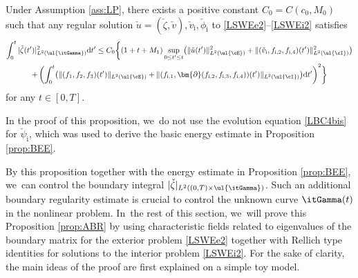 \begin{proposition}\label{prop:ABR}
Under Assumption \ref{ass:LP}, there exists a positive constant $C_0=C(c_0,M_0)$ such that any regular solution
$\check{u}=(\check{\zeta},\check{v}), \check{v}_\mathrm{i}, \check{\phi}_\mathrm{i}$ to \eqref{LSWEe2}--\eqref{LSWEi2} satisfies
\begin{multline*}
\int_0^t|\check{\zeta}(t') |_{L^2(\ul{\itGamma})}^2\mathrm{d}t'
\leq C_0 \biggl\{ (1+t+M_1)\sup_{0\leq t'\leq t}\bigl(\|\check{u}(t')\|_{L^2(\ul{\cE})}^2
+ \|(\check{v}_\mathrm{i},f_{{\rm i},2},f_{{\rm i},4})(t')\|_{L^2(\ul{\cI})}^2 \bigr) \\
+ \left(\int_0^t \bigl(\|(f_1,f_2,f_3)(t')\|_{L^2(\ul{\cE})}
+ \|(f_{{\rm i},1},\bm{\partial}(f_{{\rm i},2},f_{{\rm i},3},f_{{\rm i},4}))(t')\|_{L^2(\ul{\cI})} \bigr){\rm d}t' \right)^2 \biggr\}
\end{multline*}
for any $t\in[0,T]$.
\end{proposition}

\begin{remark}
In the proof of this proposition, we~do not use the evolution equation \eqref{LBC4bis} for $\check{\psi}_\mathrm{i}$,
which was used to derive the basic energy estimate in Proposition \ref{prop:BEE}.
\end{remark}

By this proposition together with the energy estimate in Proposition \ref{prop:BEE}, we~can control the boundary integral
$|\check{\zeta}|_{L^2((0,T)\times\ul{\itGamma})}$.
Such an additional boundary regularity estimate is crucial to control the unknown curve $\itGamma(t)$ in the nonlinear problem. In~the rest of this section, we~will prove this Proposition \ref{prop:ABR} by using characteristic fields related to eigenvalues of the boundary matrix for the exterior problem \eqref{LSWEe2}
together with Rellich type identities for solutions to the interior problem \eqref{LSWEi2}.
For the sake of clarity, the main ideas of the proof are first explained on a simple toy model.

